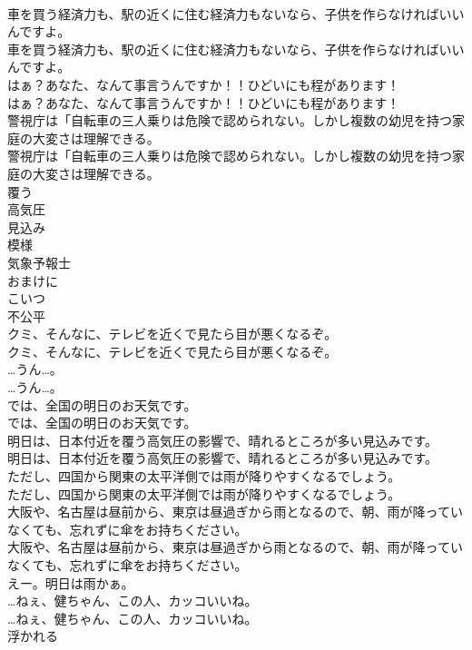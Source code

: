 \documentclass[8pt]{extreport}
\begin{document}
\begin{CJK}{UTF8}{min}
\\	車を買う経済力も、駅の近くに住む経済力もないなら、子供を作らなければいいんですよ。	
\\	車を買う経済力も、駅の近くに住む経済力もないなら、子供を作らなければいいんですよ。 
\\	はぁ？あなた、なんて事言うんですか！！ひどいにも程があります！	
\\	はぁ？あなた、なんて事言うんですか！！ひどいにも程があります！ 
\\	警視庁は「自転車の三人乗りは危険で認められない。しかし複数の幼児を持つ家庭の大変さは理解できる。	
\\	警視庁は「自転車の三人乗りは危険で認められない。しかし複数の幼児を持つ家庭の大変さは理解できる。 
\\	覆う
\\	高気圧
\\	見込み
\\	模様
\\	気象予報士
\\	おまけに
\\	こいつ
\\	不公平
\\	クミ、そんなに、テレビを近くで見たら目が悪くなるぞ。	
\\	クミ、そんなに、テレビを近くで見たら目が悪くなるぞ。 
\\	…うん…。	
\\	…うん…。 
\\	では、全国の明日のお天気です。	
\\	では、全国の明日のお天気です。 
\\	明日は、日本付近を覆う高気圧の影響で、晴れるところが多い見込みです。	
\\	明日は、日本付近を覆う高気圧の影響で、晴れるところが多い見込みです。 
\\	ただし、四国から関東の太平洋側では雨が降りやすくなるでしょう。	
\\	ただし、四国から関東の太平洋側では雨が降りやすくなるでしょう。 
\\	大阪や、名古屋は昼前から、東京は昼過ぎから雨となるので、朝、雨が降っていなくても、忘れずに傘をお持ちください。	
\\	大阪や、名古屋は昼前から、東京は昼過ぎから雨となるので、朝、雨が降っていなくても、忘れずに傘をお持ちください。 
\\	えー。明日は雨かぁ。 
\\	…ねぇ、健ちゃん、この人、カッコいいね。	
\\	…ねぇ、健ちゃん、この人、カッコいいね。 
\\	浮かれる

\end{CJK}
\end{document}
